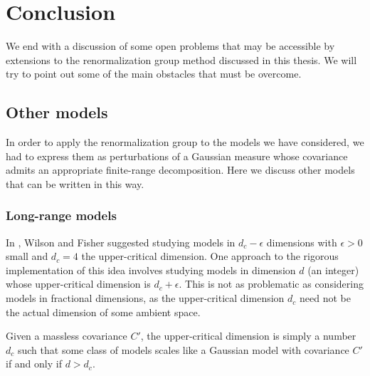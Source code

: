 \chapter{Conclusion}
\label{sec:conclusion}

\setcounter{footnote}{0}

We end with a discussion of some open problems that may be accessible by
extensions to the renormalization group method discussed in this thesis.
We will try to point out some of the main obstacles that must be overcome.


\section{Other models}

In order to apply the renormalization group to the models we have considered,
we had to express them as perturbations of a Gaussian measure whose covariance
admits an appropriate finite-range decomposition. Here we discuss other models
that can be written in this way.


\subsection{Long-range models}

In \cite{WF72}, Wilson and Fisher suggested studying models in $d_c - \epsilon$
dimensions with $\epsilon > 0$ small and $d_c = 4$ the upper-critical dimension.
One approach to the rigorous implementation of this idea
involves studying models in dimension $d$ (an integer) whose upper-critical
dimension is $d_c + \epsilon$. This is not as problematic as considering
models in fractional dimensions, as the upper-critical dimension $d_c$ need not
be the actual dimension of some ambient space.

Given a massless covariance $C'$, the upper-critical
dimension is simply a number $d_c$ such that some class of models scales like a
Gaussian model with covariance $C'$ if and only if $d > d_c$.


